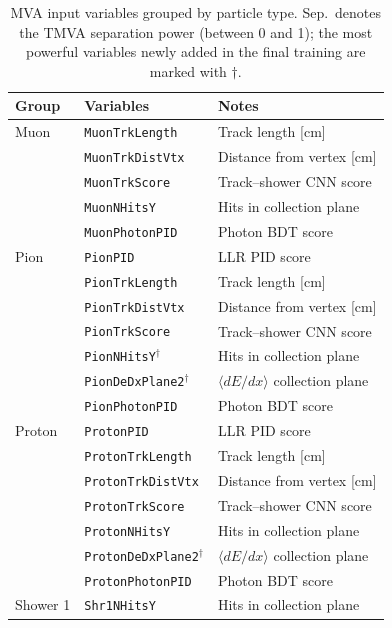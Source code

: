\documentclass[12pt,a4paper]{article}
\begin{document}
\begin{table}[H]
  \centering
  \caption{MVA input variables grouped by particle type.  Sep.\ denotes
           the TMVA separation power (between 0 and 1); the most powerful
           variables newly added in the final training are marked with
           $\dagger$.}
  \label{tab:mvavars}
  \begin{tabular}{lll}
    \toprule
    Group & Variables & Notes \\
    \midrule
    Muon
      & \texttt{MuonTrkLength}   & Track length [cm] \\
      & \texttt{MuonTrkDistVtx}  & Distance from vertex [cm] \\
      & \texttt{MuonTrkScore}    & Track--shower CNN score \\
      & \texttt{MuonNHitsY}      & Hits in collection plane \\
      & \texttt{MuonPhotonPID}   & Photon BDT score \\
    \midrule
    Pion
      & \texttt{PionPID}         & LLR PID score \\
      & \texttt{PionTrkLength}   & Track length [cm] \\
      & \texttt{PionTrkDistVtx}  & Distance from vertex [cm] \\
      & \texttt{PionTrkScore}    & Track--shower CNN score \\
      & \texttt{PionNHitsY}$^\dagger$ & Hits in collection plane \\
      & \texttt{PionDeDxPlane2}$^\dagger$ & $\langle dE/dx\rangle$ collection plane \\
      & \texttt{PionPhotonPID}   & Photon BDT score \\
    \midrule
    Proton
      & \texttt{ProtonPID}       & LLR PID score \\
      & \texttt{ProtonTrkLength} & Track length [cm] \\
      & \texttt{ProtonTrkDistVtx}& Distance from vertex [cm] \\
      & \texttt{ProtonTrkScore}  & Track--shower CNN score \\
      & \texttt{ProtonNHitsY}    & Hits in collection plane \\
      & \texttt{ProtonDeDxPlane2}$^\dagger$ & $\langle dE/dx\rangle$ collection plane \\
      & \texttt{ProtonPhotonPID} & Photon BDT score \\
    \midrule
    Shower 1
      & \texttt{Shr1NHitsY}      & Hits in collection plane \\

\end{tabular}
\end{table}
\end{document}
